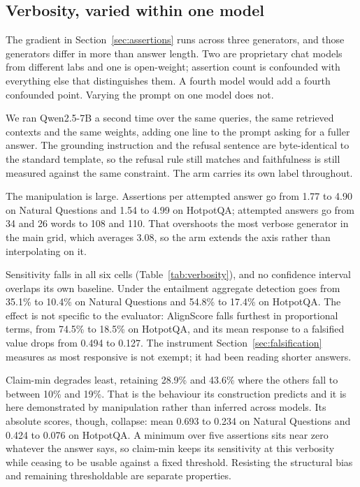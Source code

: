 \documentclass[11pt]{article}
\begin{document}
\subsection{Verbosity, varied within one model}
\label{sec:verbosity}

The gradient in Section~\ref{sec:assertions} runs across three generators, and those generators differ in more than answer length. Two are proprietary chat models from different labs and one is open-weight; assertion count is confounded with everything else that distinguishes them. A fourth model would add a fourth confounded point. Varying the prompt on one model does not.

We ran Qwen2.5-7B a second time over the same queries, the same retrieved contexts and the same weights, adding one line to the prompt asking for a fuller answer. The grounding instruction and the refusal sentence are byte-identical to the standard template, so the refusal rule still matches and faithfulness is still measured against the same constraint. The arm carries its own label throughout.

The manipulation is large. Assertions per attempted answer go from 1.77 to 4.90 on Natural Questions and 1.54 to 4.99 on HotpotQA; attempted answers go from 34 and 26 words to 108 and 110. That overshoots the most verbose generator in the main grid, which averages 3.08, so the arm extends the axis rather than interpolating on it.

Sensitivity falls in all six cells (Table~\ref{tab:verbosity}), and no confidence interval overlaps its own baseline. Under the entailment aggregate detection goes from 35.1\% to 10.4\% on Natural Questions and 54.8\% to 17.4\% on HotpotQA. The effect is not specific to the evaluator: AlignScore falls furthest in proportional terms, from 74.5\% to 18.5\% on HotpotQA, and its mean response to a falsified value drops from 0.494 to 0.127. The instrument Section~\ref{sec:falsification} measures as most responsive is not exempt; it had been reading shorter answers.

Claim-min degrades least, retaining 28.9\% and 43.6\% where the others fall to between 10\% and 19\%. That is the behaviour its construction predicts and it is here demonstrated by manipulation rather than inferred across models. Its absolute scores, though, collapse: mean 0.693 to 0.234 on Natural Questions and 0.424 to 0.076 on HotpotQA. A minimum over five assertions sits near zero whatever the answer says, so claim-min keeps its sensitivity at this verbosity while ceasing to be usable against a fixed threshold. Resisting the structural bias and remaining thresholdable are separate properties.
\end{document}

